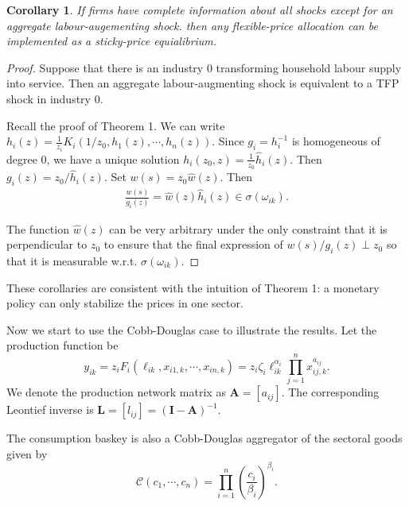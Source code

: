 \documentclass[12pt]{article}
\newtheorem{corollary}{Corollary}
\numberwithin{equation}{section}
\begin{document}
\begin{corollary}
    If firms have complete information about all shocks except for an aggregate labour-augementing shock. then any flexible-price allocation can be implemented as a sticky-price equialibrium.
\end{corollary}

\begin{proof}
    Suppose that there is an industry $0$ transforming household labour supply into service. Then an aggregate labour-augmenting shock is equivalent to a TFP shock in industry $0$. 

    Recall the proof of Theorem 1. We can write $h_i(z) = \frac{1}{z_i} K_i(1/z_0, h_1(z), \cdots, h_n(z))$. Since $g_i = h_i^{-1}$ is homogeneous of degree 0, we have a unique solution $h_i(z_0, z) = \frac{1}{z_0} \hat{h}_i(z)$.  Then $g_i(z) = z_0/\hat{h}_i(z)$. Set $w(s) = z_0 \hat{w}(z)$. Then
    \begin{align*}
        \frac{w(s)}{g_i(z)} = \hat{w}(z) \hat{h}_i(z) \in \sigma(\omega_{ik}).
    \end{align*}

    The function $\hat{w}(z)$ can be very arbitrary under the only constraint that it is perpendicular to $z_0$ to ensure that the final expression of $w(s)/g_i(z) \perp z_0$ so that it is measurable w.r.t. $\sigma(\omega_{ik})$.
\end{proof}

These corollaries are consistent with the intuition of Theorem 1: a monetary policy can only stabilize the prices in one sector.

Now we start to use the Cobb-Douglas case to illustrate the results. Let the production function be
\[y_{ik} = z_i F_i(\ell_{ik}, x_{i1,k}, \cdots, x_{in,k}) = z_i \zeta_i \ell_{ik}^{\alpha_i} \prod_{j=1}^n x_{ij,k}^{a_{ij}}.\]
We denote the production network matrix as $\mathbf{A}=[a_{ij}]$. The corresponding Leontief inverse is $\mathbf{L}=[l_{ij}] = (\mathbf{I}-\mathbf{A})^{-1}$.

The consumption baskey is also a Cobb-Douglas aggregator of the sectoral goods given by
\[\mathcal{C}(c_1, \cdots, c_n) = \prod_{i=1}^n\left(\frac{c_i}{\beta_i}\right)^{\beta_i}.\]
\end{document}
